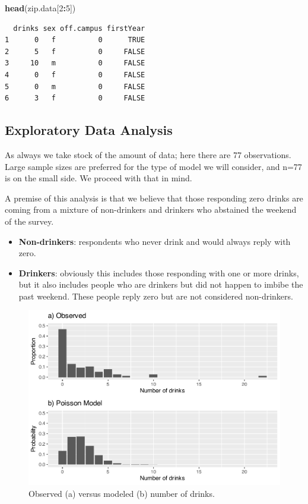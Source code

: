 \documentclass[
]{krantz}
\newenvironment{Shaded}{\begin{snugshade}}{\end{snugshade}}
\newcommand{\DecValTok}[1]{\textcolor[rgb]{0.06,0.06,0.06}{#1}}
\newcommand{\KeywordTok}[1]{\textcolor[rgb]{0.27,0.27,0.27}{\textbf{#1}}}
\newcommand{\NormalTok}[1]{#1}
\newcommand{\OperatorTok}[1]{\textcolor[rgb]{0.43,0.43,0.43}{\textbf{#1}}}
\providecommand{\tightlist}{%
  \setlength{\itemsep}{0pt}\setlength{\parskip}{0pt}}
\begin{document}
\begin{Shaded}
\begin{Highlighting}[]
\KeywordTok{head}\NormalTok{(zip.data[}\DecValTok{2}\OperatorTok{:}\DecValTok{5}\NormalTok{])}
\end{Highlighting}
\end{Shaded}

\begin{verbatim}
  drinks sex off.campus firstYear
1      0   f          0      TRUE
2      5   f          0     FALSE
3     10   m          0     FALSE
4      0   f          0     FALSE
5      0   m          0     FALSE
6      3   f          0     FALSE
\end{verbatim}

\hypertarget{exploratory-data-analysis-1}{%
\subsection{Exploratory Data Analysis}\label{exploratory-data-analysis-1}}

As always we take stock of the amount of data; here there are 77 observations. Large sample sizes are preferred for the type of model we will consider, and n=77 is on the small side. We proceed with that in mind.

A premise of this analysis is that we believe that those responding zero drinks are coming from a mixture of non-drinkers and drinkers who abstained the weekend of the survey.

\begin{itemize}
\tightlist
\item
  \textbf{Non-drinkers}: respondents who never drink and would always reply with zero.
\item
  \textbf{Drinkers}: obviously this includes those responding with one or more drinks, but it also includes people who are drinkers but did not happen to imbibe the past weekend. These people reply zero but are not considered non-drinkers.
\end{itemize}

\begin{figure}

{\centering \includegraphics[width=0.6\linewidth]{bookdown-BeyondMLR_files/figure-latex/obsVmodel-1} 

}

\caption{Observed (a) versus modeled (b) number of drinks.}\label{fig:obsVmodel}
\end{figure}
\end{document}
